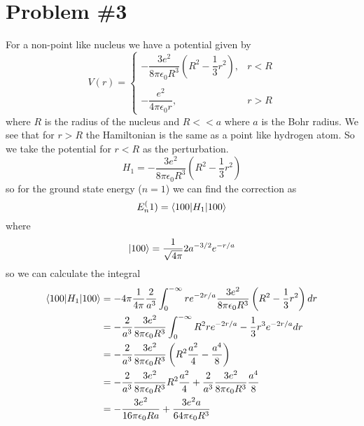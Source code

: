 \documentclass[11pt]{article}
\numberwithin{equation}{section}
\begin{document}
\section{Problem \#3}
For a non-point like nucleus we have a potential given by
$$V(r) = \left\{\begin{array}{lr}
-\dfrac{3e^2}{8\pi\epsilon_0R^3}\left(R^2-\dfrac{1}{3}r^2\right),  &r<R\\
\\
-\dfrac{e^2}{4\pi\epsilon_0r},                                     &r>R
          \end{array}\right.$$
where $R$ is the radius of the nucleus and $R<<a$ where $a$ is the Bohr radius. We see that for $r>R$ the Hamiltonian is the same as a point like hydrogen atom. So we take the potential for $r<R$ as the perturbation.
$$H_1 = -\dfrac{3e^2}{8\pi\epsilon_0R^3}\left(R^2-\dfrac{1}{3}r^2\right)$$
so for the ground state energy ($n=1$) we can find the correction as
$$E_n^(1) = \langle{100}|H_1|{100}\rangle$$
where
$$|{100}\rangle = \frac{1}{\sqrt{4\pi}}2a^{-3/2}e^{-r/a}$$
so we can calculate the integral
\begin{align*}
\langle{100}|H_1|{100}\rangle &= -4\pi\frac{1}{4\pi}\frac{2}{a^3}\int_{0}^{-\infty}re^{-2r/a}\dfrac{3e^2}{8\pi\epsilon_0R^3}\left(R^2-\dfrac{1}{3}r^2\right)dr\\
&= -\frac{2}{a^3}\frac{3e^2}{8\pi\epsilon_0R^3}\int_{0}^{-\infty}R^2re^{-2r/a}-\frac{1}{3}r^3e^{-2r/a}dr\\
&= -\frac{2}{a^3}\frac{3e^2}{8\pi\epsilon_0R^3}\left(R^2\frac{a^2}{4} - \frac{a^4}{8}\right)\\
&= -\frac{2}{a^3}\frac{3e^2}{8\pi\epsilon_0R^3}R^2\frac{a^2}{4} + \frac{2}{a^3}\frac{3e^2}{8\pi\epsilon_0R^3}\frac{a^4}{8}\\
&= -\frac{3e^2}{16\pi\epsilon_0Ra} + \frac{3e^2a}{64\pi\epsilon_0R^3}
\end{align*}
\end{document}

